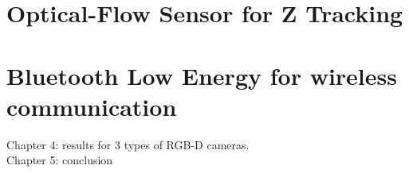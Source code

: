 \section{Optical-Flow Sensor for Z Tracking}
%
%
%
%
\section{Bluetooth Low Energy for wireless communication}
%
%
%
%
%
%
%
Chapter 4: results for 3 types of RGB-D cameras.\\
Chapter 5: conclusion\\






































